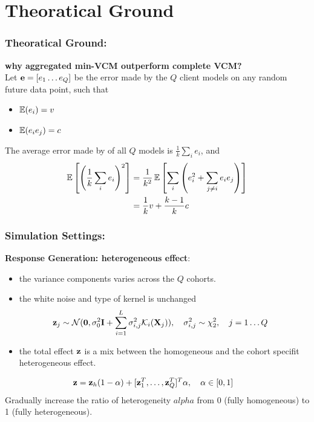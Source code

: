 \documentclass{beamer}
\begin{document}
\section{Theoratical Ground}
\begin{frame} \frametitle{Theoratical Ground:}%
  \textbf{why aggregated min-VCM outperform complete VCM?} \\
  Let $\mathbf{e}=[e_1 \dots e_Q]$ be the error made by the $Q$ client models
  on any random future data point, such that
  \begin{itemize}
  \item $\operatorname{\mathbb{E}}(e_i) = v$
  \item $\operatorname{\mathbb{E}}(e_i e_j) = c$
  \end{itemize}
  The average error made by of all $Q$ models is
  $\frac{1}{k}\sum_i e_i$, and
  \begin{align}
    \operatorname{\mathbb{E}}\left[ \left(\frac{1}{k}\sum_i e_i\right)^2 \right]
    &= \frac{1}{k^2}\operatorname{\mathbb{E}}\left[\sum_i \left(e_i^2 + \sum_{j \ne i}e_ie_j \right)  \right] \\
    &= \frac{1}{k}v + \frac{k-1}{k}c
  \end{align}
\end{frame}
\begin{frame}
  \frametitle{Simulation Settings:} %
  \textbf{Response Generation: heterogeneous effect}:\\
  \begin{itemize}
  \item the variance components varies across the $Q$ cohorts.
  \item the white noise and type of kernel is unchanged
    \begin{align*}
      \mathbf{z}_j & \sim \mathcal{N}(\boldsymbol{0}, \sigma^2_0 \textbf{I} + \sum_{i=1}^L
              \sigma_{i,j}^2 \mathcal{K}_i(\mathbf{X}_j)), \quad
              \sigma_{i,j}^2 \sim \chi_2^2, \quad
              j = 1 \dots Q
    \end{align*}
  \item the total effect $\mathbf{z}$ is a mix between the homogeneous and
    the cohort specifit heterogeneous effect.
  \end{itemize}
  \begin{align*}
    \mathbf{z} & = \mathbf{z}_h (1-\alpha) + [\mathbf{z}_1^T, \dots, \mathbf{z}_Q^T]^T \alpha,
          \quad \alpha \in [0, 1]
  \end{align*}
  Gradually increase the ratio of heterogeneity $alpha$ from 0 (fully
  homogeneous) to 1 (fully heterogeneous).
\end{frame}
\end{document}
